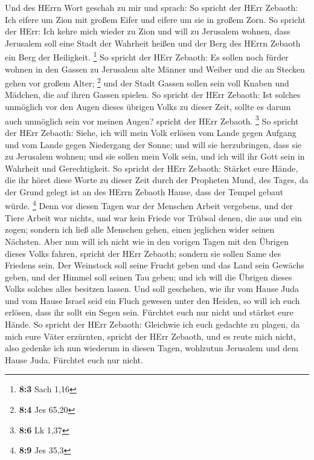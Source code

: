  Und des HErrn Wort geschah zu mir und sprach:
 So spricht der HErr Zebaoth: Ich eifere um Zion mit
großem Eifer und eifere um sie in großem Zorn.  So spricht
der HErr: Ich kehre mich wieder zu Zion und will zu Jerusalem wohnen,
dass Jerusalem soll eine Stadt der Wahrheit heißen und der Berg des
HErrn Zebaoth ein Berg der Heiligkeit. \footnote{\textbf{8:3} Sach 1,16}
 So spricht der HErr Zebaoth: Es sollen noch fürder wohnen
in den Gassen zu Jerusalem alte Männer und Weiber und die an Stecken
gehen vor großem Alter; \footnote{\textbf{8:4} Jes 65,20} 
und der Stadt Gassen sollen sein voll Knaben und Mädchen, die auf ihren
Gassen spielen.  So spricht der HErr Zebaoth: Ist solches
unmöglich vor den Augen dieses übrigen Volks zu dieser Zeit, sollte es
darum auch unmöglich sein vor meinen Augen? spricht der HErr Zebaoth.
\footnote{\textbf{8:6} Lk 1,37}  So spricht der HErr
Zebaoth: Siehe, ich will mein Volk erlösen vom Lande gegen Aufgang und
vom Lande gegen Niedergang der Sonne;  und will sie
herzubringen, dass sie zu Jerusalem wohnen; und sie sollen mein Volk
sein, und ich will ihr Gott sein in Wahrheit und Gerechtigkeit.
 So spricht der HErr Zebaoth: Stärket eure Hände, die ihr
höret diese Worte zu dieser Zeit durch der Propheten Mund, des Tages, da
der Grund gelegt ist an des HErrn Zebaoth Hause, dass der Tempel gebaut
würde. \footnote{\textbf{8:9} Jes 35,3}  Denn vor diesen
Tagen war der Menschen Arbeit vergebens, und der Tiere Arbeit war
nichts, und war kein Friede vor Trübsal denen, die aus und ein zogen;
sondern ich ließ alle Menschen gehen, einen jeglichen wider seinen
Nächsten.  Aber nun will ich nicht wie in den vorigen
Tagen mit den Übrigen dieses Volks fahren, spricht der HErr Zebaoth;
 sondern sie sollen Same des Friedens sein. Der Weinstock
soll seine Frucht geben und das Land sein Gewächs geben, und der Himmel
soll seinen Tau geben; und ich will die Übrigen dieses Volks solches
alles besitzen lassen.  Und soll geschehen, wie ihr vom
Hause Juda und vom Hause Israel seid ein Fluch gewesen unter den Heiden,
so will ich euch erlösen, dass ihr sollt ein Segen sein. Fürchtet euch
nur nicht und stärket eure Hände.  So spricht der HErr
Zebaoth: Gleichwie ich euch gedachte zu plagen, da mich eure Väter
erzürnten, spricht der HErr Zebaoth, und es reute mich nicht,
 also gedenke ich nun wiederum in diesen Tagen, wohlzutun
Jerusalem und dem Hause Juda. Fürchtet euch nur nicht. 
